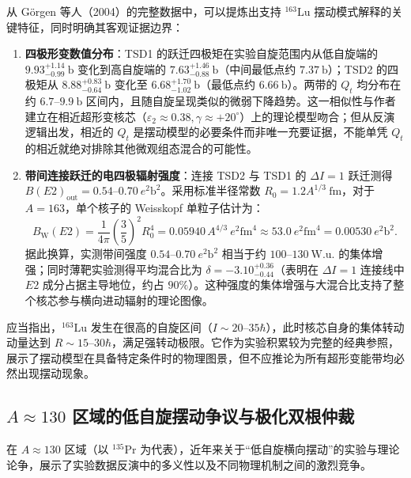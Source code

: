从 Görgen 等人（2004）的完整数据中，可以提炼出支持 $^{163}\mathrm{Lu}$ 摆动模式解释的关键特征，同时明确其客观证据边界：
\begin{enumerate}
\item \textbf{四极形变数值分布}：TSD1 的跃迁四极矩在实验自旋范围内从低自旋端的 $9.93_{-0.99}^{+1.14}\ \mathrm{b}$ 变化到高自旋端的 $7.63_{-0.88}^{+1.46}\ \mathrm{b}$（中间最低点约 $7.37\ \mathrm{b}$）；TSD2 的四极矩从 $8.88_{-0.64}^{+0.83}\ \mathrm{b}$ 变化至 $6.68_{-1.02}^{+1.70}\ \mathrm{b}$（最低点约 $6.66\ \mathrm{b}$）。两带的 $Q_t$ 均分布在约 $6.7$--$9.9\ \mathrm{b}$ 区间内，且随自旋呈现类似的微弱下降趋势。这一相似性与作者建立在相近超形变核芯（$\varepsilon_2 \approx 0.38, \gamma \approx +20^\circ$）上的理论模型吻合；但从反演逻辑出发，相近的 $Q_t$ 是摆动模型的必要条件而非唯一充要证据，不能单凭 $Q_t$ 的相近就绝对排除其他微观组态混合的可能性。
\item \textbf{带间连接跃迁的电四极辐射强度}：连接 TSD2 与 TSD1 的 $\Delta I = 1$ 跃迁测得 $B(E2)_{\mathrm{out}} = 0.54$--$0.70\ e^2\mathrm{b}^2$。采用标准半径常数 $R_0 = 1.2 A^{1/3}\ \mathrm{fm}$，对于 $A=163$，单个核子的 Weisskopf 单粒子估计为：
\begin{equation}\label{eq:4-4-weisskopf-e2}
B_{\mathrm{W}}(E2) = \frac{1}{4\pi}\left(\frac{3}{5}\right)^2 R_0^4 = 0.05940\, A^{4/3}\ e^2\mathrm{fm}^4 \approx 53.0\ e^2\mathrm{fm}^4 = 0.00530\ e^2\mathrm{b}^2.
\end{equation}
据此换算，实测带间强度 $0.54$--$0.70\ e^2\mathrm{b}^2$ 相当于约 $100$--$130\ \mathrm{W.u.}$ 的集体增强；同时薄靶实验测得平均混合比为 $\delta = -3.10_{-0.44}^{+0.36}$（表明在 $\Delta I = 1$ 连接线中 $E2$ 成分占据主导地位，约占 $90\%$）。这种强度的集体增强与大混合比支持了整个核芯参与横向进动辐射的理论图像。
\end{enumerate}

应当指出，$^{163}\mathrm{Lu}$ 发生在很高的自旋区间（$I \sim 20$--$35\hbar$），此时核芯自身的集体转动动量达到 $R \sim 15$--$30\hbar$，满足强转动极限。它作为实验积累较为完整的经典参照，展示了摆动模型在具备特定条件时的物理图景，但不应推论为所有超形变能带均必然出现摆动现象。

\subsection{$A\approx 130$ 区域的低自旋摆动争议与极化双根仲裁}\label{sec:4-4-3}

在 $A\approx 130$ 区域（以 $^{135}\mathrm{Pr}$ 为代表），近年来关于“低自旋横向摆动”的实验与理论论争，展示了实验数据反演中的多义性以及不同物理机制之间的激烈竞争。

